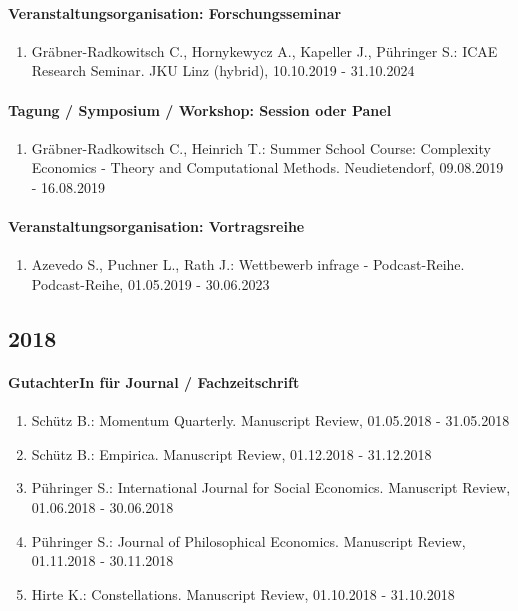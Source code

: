 \paragraph{Veranstaltungsorganisation: Forschungsseminar} 
\begin{enumerate}[leftmargin=*, labelsep=0.5cm] 
 	 \item Gräbner-Radkowitsch C., Hornykewycz A., Kapeller J., Pühringer S.: ICAE Research Seminar. JKU Linz (hybrid), 10.10.2019 - 31.10.2024 
\end{enumerate} 
\paragraph{Tagung / Symposium / Workshop: Session oder Panel} 
\begin{enumerate}[leftmargin=*, labelsep=0.5cm] 
 	 \item Gräbner-Radkowitsch C., Heinrich T.: Summer School Course: Complexity Economics - Theory and Computational Methods. Neudietendorf, 09.08.2019 - 16.08.2019 
\end{enumerate} 
\paragraph{Veranstaltungsorganisation: Vortragsreihe} 
\begin{enumerate}[leftmargin=*, labelsep=0.5cm] 
 	 \item Azevedo S., Puchner L., Rath J.: Wettbewerb infrage - Podcast-Reihe. Podcast-Reihe, 01.05.2019 - 30.06.2023 
\end{enumerate} 
\subsection*{2018} 
\paragraph{GutachterIn für Journal / Fachzeitschrift} 
\begin{enumerate}[leftmargin=*, labelsep=0.5cm] 
 	 \item Schütz B.: Momentum Quarterly. Manuscript Review, 01.05.2018 - 31.05.2018 
	 \item Schütz B.: Empirica. Manuscript Review, 01.12.2018 - 31.12.2018 
	 \item Pühringer S.: International Journal for Social Economics. Manuscript Review, 01.06.2018 - 30.06.2018 
	 \item Pühringer S.: Journal of Philosophical Economics. Manuscript Review, 01.11.2018 - 30.11.2018 
	 \item Hirte K.: Constellations. Manuscript Review, 01.10.2018 - 31.10.2018 
\end{enumerate} 
